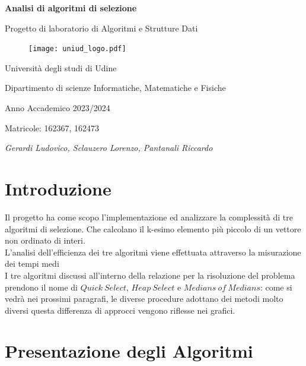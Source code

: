 \documentclass[a4paper]{article}
\begin{document}
\begin{titlepage} %
    \begin{center}
        \vspace*{1cm}
        {\Huge\bfseries Analisi di algoritmi di selezione\par}
        \vspace{.5cm}
        {\LARGE Progetto di laboratorio di Algoritmi e Strutture Dati\par}
        \vspace{1cm}
        \begin{figure}[h]
            \centering
            \texttt{[image: uniud\_logo.pdf]}
        \end{figure}
        \vspace{1.5cm}
        {\LARGE Università degli studi di Udine\par}
        {\LARGE Dipartimento di scienze Informatiche, Matematiche e Fisiche\par}
        \vfill
        {\Large Anno Accademico 2023/2024\par}
        {\Large Matricole: 162367, 162473\par}
        {\Large\itshape Gerardi Ludovico, Sclauzero Lorenzo, Pantanali Riccardo\par}
    \end{center}
\end{titlepage}
\newpage
\section{Introduzione}
Il progetto ha come scopo l'implementazione ed analizzare la complessità di tre algoritmi di selezione. Che calcolano il k-esimo elemento più piccolo di un vettore non ordinato di interi.\\
L'analisi dell'efficienza dei tre algoritmi viene effettuata attraverso la misurazione dei tempi medi\\
I tre algoritmi discussi all'interno della relazione per la risoluzione del problema prendono il nome di $Quick\ Select$, $Heap\ Select$ e $Medians\ of\ Medians$: come si vedrà nei prossimi paragrafi, le diverse procedure adottano dei metodi molto diversi questa differenza di approcci vengono riflesse nei grafici.\\
\section{Presentazione degli Algoritmi}
\end{document}
